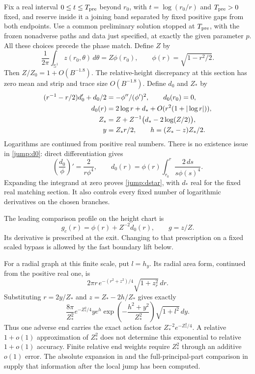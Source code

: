 Fix a real interval $0\le t\le T_{\rm pre}$ beyond $r_0$, with
$t=\log(r_0/r)$ and $T_{\rm pre}>0$ fixed, and reserve inside it a
joining band separated by fixed positive gaps from both endpoints.
Use a common preliminary solution stopped at $T_{\rm pre}$, with the
frozen nonadverse paths and data just specified, at exactly the given
parameter $p$.  All these choices precede the phase match.  Define $Z$ by
\begin{equation}\label{jump:matching-Z}
 \frac1{2\pi}\int_{\mathbb S^1}z(r_0,\theta)\,d\theta=Z\phi(r_0),
 \qquad \phi(r)=\sqrt{1-r^2/2}.
\end{equation}
Then $Z/Z_0=1+O(B^{-1.8})$.  The relative-height discrepancy at this
section has zero mean and strip and trace size $O(B^{-1.8})$.
Define $d_0$ and $Z_*$ by
\begin{align}
 (r^{-1}-r/2)d_0'+d_0/2
   &=-\phi''/(\phi')^2,\qquad d_0(r_0)=0,\label{jump:d0}\\
 d_0(r)&=2\log r+d_*+O(r^2(1+|\log r|)),
 \label{jump:dstar}\\
 Z_*&=Z+Z^{-1}\bigl(d_*-2\log(Z/2)\bigr),\label{jump:scaling}\\
 y&=Z_*r/2,\qquad h=(Z_*-z)Z_*/2.\notag
\end{align}
Logarithms are continued from positive real numbers.  There is no
existence issue in \eqref{jump:d0}: direct differentiation gives
\begin{equation}\label{jump:d0-integral}
 \left(\frac{d_0}{\phi}\right)'=\frac{2}{r\phi^4},
 \qquad
 d_0(r)=\phi(r)\int_{r_0}^{r}\frac{2\,ds}{s\phi(s)^4}.
\end{equation}
Expanding the integrand at zero proves \eqref{jump:dstar}, with $d_*$
real for the fixed real matching section.  It also controls every fixed
number of logarithmic derivatives on the chosen branches.

The leading comparison profile on the height chart is
\begin{equation}\label{jump:height-profile}
 g_c(r)=\phi(r)+Z^{-2}d_0(r),\qquad g=z/Z.
\end{equation}
Its derivative is prescribed at the exit.  Changing to that prescription
on a fixed scaled bypass is allowed by the fast boundary lift below.

For a radial graph at this finite scale, put $l=h_y$.  Its radial
area form, continued from the positive real one, is
\[
 2\pi r\,e^{-(r^2+z^2)/4}\sqrt{1+z_r^2}\,dr.
\]
Substituting $r=2y/Z_*$ and $z=Z_*-2h/Z_*$ gives exactly
\begin{equation}\label{jump:physical-action}
 \frac{8\pi}{Z_*^2}e^{-Z_*^2/4}
       ye^h\exp\left(-\frac{h^2+y^2}{Z_*^2}\right)
                                      \sqrt{1+l^2}\,dy.
\end{equation}
Thus one adverse end carries the exact action factor
$Z_*^{-2}e^{-Z_*^2/4}$.  A relative $1+o(1)$ approximation of $Z_*^2$
does not determine this exponential to relative $1+o(1)$ accuracy.
Finite relative end weights require $Z_*^2$ through an additive $o(1)$
error.  The absolute expansion in  and the
full-principal-part comparison in  supply that
information after the local jump has been computed.

